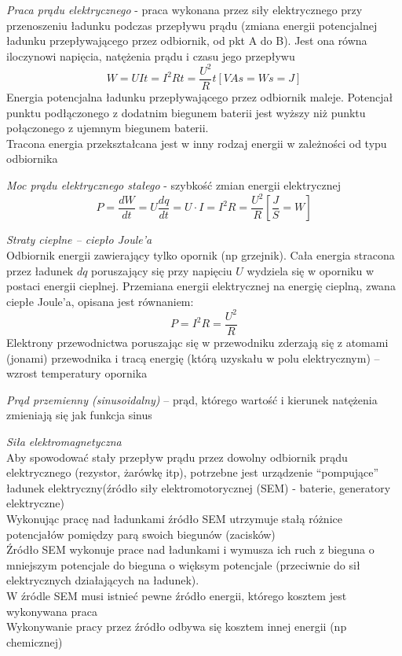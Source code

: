 \documentclass[a4paper,11pt]{article}
\begin{document}
\emph{Praca prądu elektrycznego} - praca wykonana przez siły elektrycznego przy przenoszeniu ładunku podczas przepływu prądu (zmiana energii potencjalnej ładunku przepływającego przez odbiornik, od pkt A do B). Jest ona równa iloczynowi napięcia, natężenia prądu i czasu jego przepływu
$$W = UIt=I^2Rt=\frac{U^2}{R}t\left[VAs=Ws=J\right]$$
Energia potencjalna ładunku przepływającego przez odbiornik maleje. Potencjał punktu podłączonego z dodatnim biegunem baterii jest wyższy niż punktu połączonego z ujemnym biegunem baterii. \\
Tracona energia przekształcana jest w inny rodzaj energii w zależności od typu odbiornika

\emph{Moc prądu elektrycznego stałego} - szybkość zmian energii elektrycznej
$$P=\frac{dW}{dt}=U\frac{dq}{dt}=U\cdot I=I^2R=\frac{U^2}{R}\left[\frac{J}{S}=W\right]$$

\emph{Straty cieplne -- ciepło Joule'a}\\
Odbiornik energii zawierający tylko opornik (np grzejnik). Cała energia stracona przez ładunek $dq$ poruszający się przy napięciu $U$ wydziela się w oporniku w postaci energii cieplnej. Przemiana energii elektrycznej na energię cieplną, zwana ciepłe Joule'a, opisana jest równaniem:
$$P=I^2R=\frac{U^2}{R}$$
Elektrony przewodnictwa poruszając się w przewodniku zderzają się z atomami (jonami) przewodnika i tracą energię (którą uzyskału w polu elektrycznym) -- wzrost temperatury opornika

\emph{Prąd przemienny (sinusoidalny)} -- prąd, którego wartość i kierunek natężenia zmieniają się jak funkcja sinus

\emph{Siła elektromagnetyczna}\\
Aby spowodować stały przepływ prądu przez dowolny odbiornik prądu elektrycznego (rezystor, żarówkę itp), potrzebne jest urządzenie ``pompujące'' ładunek elektryczny(źródło siły elektromotorycznej (SEM) - baterie, generatory elektryczne)\\
Wykonując pracę nad ładunkami źródło SEM utrzymuje stałą różnice potencjałów pomiędzy parą swoich biegunów (zacisków)\\
Źródło SEM wykonuje prace nad ładunkami i wymusza ich ruch z bieguna o mniejszym potencjale do bieguna o więksym potencjale (przeciwnie do sił elektrycznych działających na ładunek). \\
W źródle SEM musi istnieć pewne źródło energii, którego kosztem jest wykonywana praca\\
Wykonywanie pracy przez źródło odbywa się kosztem innej energii (np chemicznej)
\end{document}
